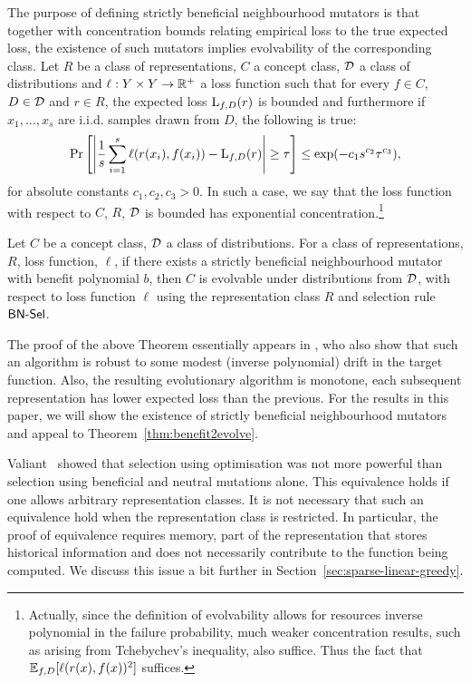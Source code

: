 The purpose of defining strictly beneficial neighbourhood mutators is that
together with concentration bounds relating empirical loss to the true expected
loss, the existence of such mutators implies evolvability of the corresponding
class. Let $R$ be a class of representations, $C$ a concept class, ${\mathcal D}$ a
class of distributions and $\ell : Y \times Y \rightarrow \mathbb{R}^+$ a loss
function such that for every $f \in C$, $D \in {\mathcal D}$ and $r \in R$, the
expected loss $\mathrm{L}_{f, D}(r)$ is bounded and furthermore if $x_1, \ldots, x_s$
are i.i.d. samples drawn from $D$, the following is true:
%
\begin{align}
\Pr\left[ \left|\frac{1}{s} \sum_{i=1}^s \ell(r(x_i), f(x_i)) - \mathrm{L}_{f,
D}(r)\right| \geq \tau \right] \leq \exp( -c_1 s^{c_2} \tau^{c_3}),
\label{eqn:concentration-bound}
\end{align}
%
for absolute constants $c_1, c_2, c_3 > 0$. In such a case, we say that the loss
function with respect to $C$, $R$, ${\mathcal D}$ is bounded has exponential
concentration.\footnote{Actually, since the definition of evolvability allows
for resources inverse polynomial in the failure probability, much weaker
concentration results, such as arising from Tchebychev's inequality, also
suffice. Thus the fact that $\mathbb{E}_{f, D}[\ell(r(x), f(x))^2]$ suffices.}

\begin{theorem} \label{thm:benefit2evolve}
Let $C$ be a concept class, ${\mathcal D}$ a class of distributions. For a class of
representations, $R$, loss function, $\ell$, if there exists a strictly
beneficial neighbourhood mutator with benefit polynomial $b$, then $C$ is
evolvable under distributions from ${\mathcal D}$, with respect to loss function
$\ell$ using the representation class $R$ and selection rule $\mathsf{BN\mbox{-}Sel}$.
\end{theorem}

The proof of the above Theorem essentially appears in \cite{KVV:2010-drift}, who
also show that such an algorithm is robust to some modest (inverse polynomial)
drift in the target function. Also, the resulting evolutionary algorithm is
monotone, \ie each subsequent representation has lower expected loss than the
previous. For the results in this paper, we will show the existence of strictly
beneficial neighbourhood mutators and appeal to
Theorem~\ref{thm:benefit2evolve}. 

\begin{remark} Valiant~\cite{Valiant:2009-evolvability} showed that selection
using optimisation was not more powerful than selection using beneficial and
neutral mutations alone. This equivalence holds if one allows arbitrary
representation classes. It is not necessary that such an equivalence hold when
the representation class is restricted. In particular, the proof of equivalence
requires memory, \ie part of the representation that stores historical
information and does not necessarily contribute to the function being computed.
We discuss this issue a bit further in Section~\ref{sec:sparse-linear-greedy}.
\end{remark}


